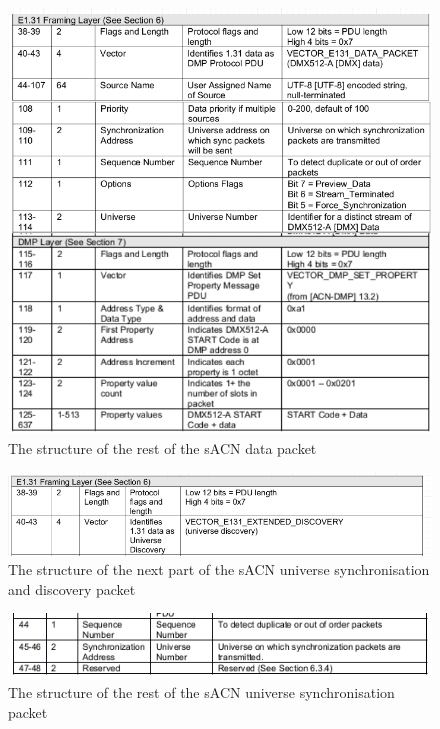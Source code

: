 \documentclass[11pt,a4paper]{article}
\begin{document}
\begin{figure}[H]
\label{ACN_DATA_STRUCTURE}
\includegraphics[width=\textwidth]{acn_data_structure}
\caption{The structure of the rest of the sACN data packet}
\end{figure}

\begin{figure}[H]
\label{ACN_EXTENDED_START}
\includegraphics[width=\textwidth]{Acn_extended_framing_structure_sync_discovery}
\caption{The structure of the next part of the sACN universe synchronisation and discovery packet}
\end{figure}

\begin{figure}[H]
\label{ACN_REST_SYNC_PACKET}
\includegraphics[width=\textwidth]{acn_sync_packet_specific_structure}
\caption{The structure of the rest of the sACN universe synchronisation packet}
\end{figure}
\end{document}
